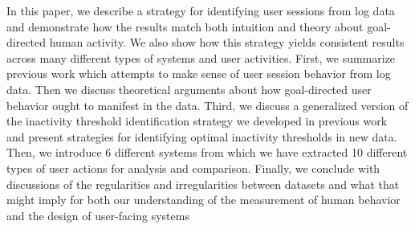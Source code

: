 In this paper, we describe a strategy for identifying user sessions from log data and demonstrate how the results match both intuition and theory about goal-directed human activity.  We also show how this strategy yields consistent results across many different types of systems and user activities.  First, we summarize previous work which attempts to make sense of user session behavior from log data.  Then we discuss theoretical arguments about how goal-directed user behavior ought to manifest in the data.  Third, we discuss a generalized version of the inactivity threshold identification strategy we developed in previous work~\cite{geiger2013using} and present strategies for identifying optimal inactivity thresholds in new data.  Then, we introduce 6 different systems from which we have extracted 10 different types of user actions for analysis and comparison.  Finally, we conclude with discussions of the regularities and irregularities between datasets and what that might imply for both our understanding of the measurement of human behavior and the design of user-facing systems

